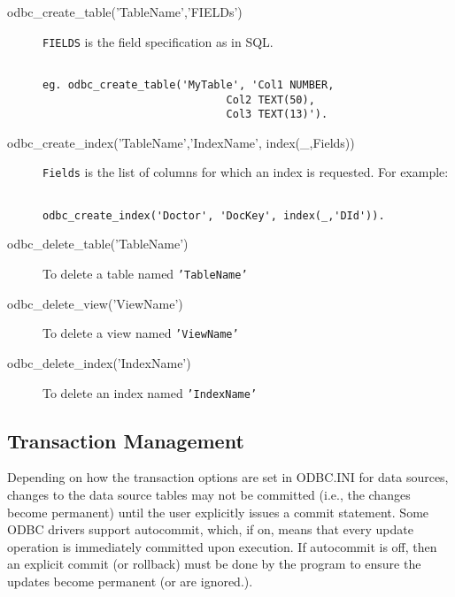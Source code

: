\begin{description}

\item[odbc\_create\_table('TableName','FIELDs')]
        {\tt FIELDS} is the field specification as in SQL.
\begin{verbatim}

eg. odbc_create_table('MyTable', 'Col1 NUMBER,
                             Col2 TEXT(50),
                             Col3 TEXT(13)').
\end{verbatim}


\item[odbc\_create\_index('TableName','IndexName', index(\_,Fields))]
        {\tt Fields} is the list of columns for which an index
        is requested.  For example:
\begin{verbatim}

odbc_create_index('Doctor', 'DocKey', index(_,'DId')).
\end{verbatim}

\item[odbc\_delete\_table('TableName')] To delete a table named {\tt 'TableName'}

\item[odbc\_delete\_view('ViewName')] To delete a view named {\tt 'ViewName'}

\item[odbc\_delete\_index('IndexName')] To delete an index named {\tt 'IndexName'}
\end{description}

\subsection{Transaction Management}\label{TransactionManagement}

Depending on how the transaction options are set in ODBC.INI for data
sources, changes to the data source tables may not be
committed (i.e., the changes become permanent) until the user explicitly
issues a commit statement.  Some ODBC drivers support autocommit,
which, if on, means that every update operation is immediately
committed upon execution.  If autocommit is off, then an explicit
commit (or rollback) must be done by the program to ensure the updates 
become permanent (or are ignored.).

